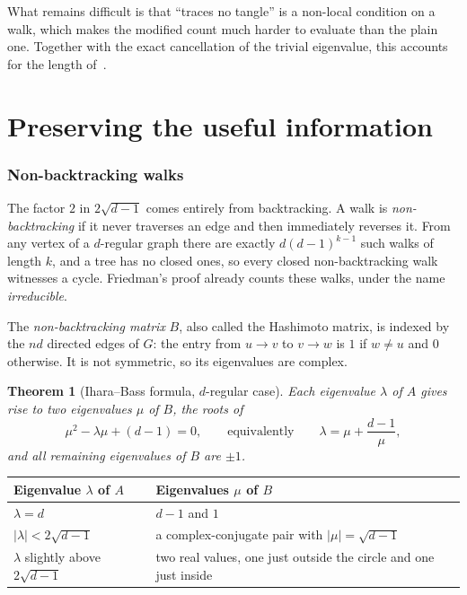 \documentclass[11pt,letterpaper]{article}
\newtheorem{theorem}{Theorem}
\theoremstyle{definition}
\theoremstyle{remark}
\newcommand{\edge}{2\sqrt{d-1}}
\begin{document}
What remains difficult is that ``traces no tangle'' is a non-local condition on a walk, which
makes the modified count much harder to evaluate than the plain one. Together with the exact
cancellation of the trivial eigenvalue, this accounts for the length of~\cite{F}.

\part{Preserving the useful information}
\section{Non-backtracking walks}

The factor $2$ in $\edge$ comes entirely from backtracking. A walk is \emph{non-backtracking} if it
never traverses an edge and then immediately reverses it. From any vertex of a $d$-regular graph
there are exactly $d(d-1)^{k-1}$ such walks of length $k$, and a tree has no closed ones, so every
closed non-backtracking walk witnesses a cycle. Friedman's proof already counts these walks,
under the name \emph{irreducible}.

The \emph{non-backtracking matrix} $B$, also called the Hashimoto matrix, is indexed by the
$nd$ directed edges of $G$: the entry from $u\to v$ to $v\to w$ is $1$ if $w\ne u$ and $0$
otherwise. It is not symmetric, so its eigenvalues are complex.

\begin{theorem}[Ihara--Bass formula, $d$-regular case]\label{thm:ib}
Each eigenvalue $\lambda$ of $A$ gives rise to two eigenvalues $\mu$ of $B$, the roots of
\[
  \mu^2-\lambda\mu+(d-1)=0,\qquad\text{equivalently}\qquad\lambda=\mu+\frac{d-1}{\mu},
\]
and all remaining eigenvalues of $B$ are $\pm1$.
\end{theorem}

\begin{center}
\begin{tabular}{@{}ll@{}}
  \toprule
  Eigenvalue $\lambda$ of $A$ & Eigenvalues $\mu$ of $B$\\
  \midrule
  $\lambda=d$ & $d-1$ and $1$\\
  $|\lambda|<\edge$ & a complex-conjugate pair with $|\mu|=\sqrt{d-1}$\\
  $\lambda$ slightly above $\edge$ & two real values, one just outside the circle and one just inside\\
  \bottomrule
\end{tabular}
\end{center}
\end{document}
